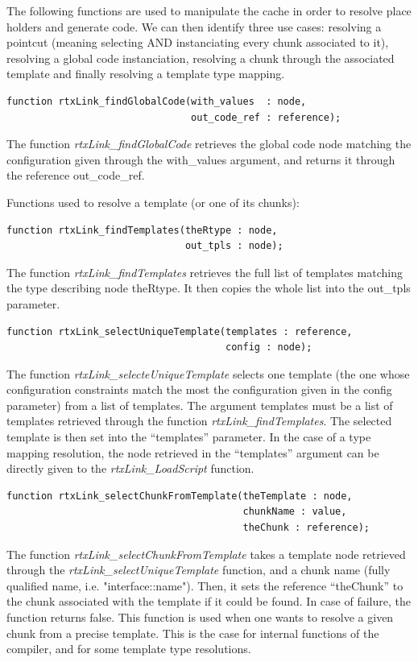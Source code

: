 \documentclass[american]{rtxreport}
\begin{document}
\begin{enumerate}
\vspace{}

The following functions are used to manipulate the cache in order to resolve
place holders and generate code. We can then identify three use cases:
resolving a pointcut (meaning selecting AND instanciating every chunk
associated to it), resolving a global code instanciation, resolving a chunk
through the associated template and finally resolving a template type mapping.

\begin{lstlisting}
function rtxLink_findGlobalCode(with_values  : node,
                                out_code_ref : reference);
\end{lstlisting}
The function \emph{rtxLink\_findGlobalCode} retrieves the global code node
matching the configuration given through the with\_values argument, and returns
it through the reference out\_code\_ref.

\vspace{}

Functions used to resolve a template (or one of its chunks):
\begin{lstlisting}
function rtxLink_findTemplates(theRtype : node,
                               out_tpls : node);
\end{lstlisting}
The function \emph{rtxLink\_findTemplates} retrieves the full list of templates
matching the type describing node theRtype. It then copies the whole list into
the out\_tpls parameter.

\begin{lstlisting}
function rtxLink_selectUniqueTemplate(templates : reference,
                                      config : node);
\end{lstlisting}
The function \emph{rtxLink\_selecteUniqueTemplate} selects one template (the
one whose configuration constraints match the most the configuration given in
the config parameter) from a list of templates. The argument templates must be
a list of templates retrieved through the function
\emph{rtxLink\_findTemplates}. The selected template is then set into the
``templates'' parameter. In the case of a type mapping resolution, the node
retrieved in the ``templates'' argument can be directly given to the
\emph{rtxLink\_LoadScript} function.

\begin{lstlisting}
function rtxLink_selectChunkFromTemplate(theTemplate : node,
                                         chunkName : value,
                                         theChunk : reference);
\end{lstlisting}
The function \emph{rtxLink\_selectChunkFromTemplate} takes a template node
retrieved through the \emph{rtxLink\_selectUniqueTemplate} function, and a
chunk name (fully qualified name, i.e. "interface::name"). Then, it sets the
reference ``theChunk'' to the chunk associated with the template if it could be
found. In case of failure, the function returns false. This function is used
when one wants to resolve a given chunk from a precise template. This is the
case for internal functions of the compiler, and for some template type
resolutions.


\end{enumerate}
\end{document}
